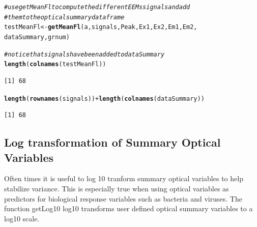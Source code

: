 \documentclass[a4paper,11pt]{article}\usepackage[]{graphicx}\usepackage[]{color}
\makeatletter
\newcommand{\hlcom}[1]{\textcolor[rgb]{0.678,0.584,0.686}{\textit{#1}}}%
\newcommand{\hlopt}[1]{\textcolor[rgb]{0,0,0}{#1}}%
\newcommand{\hlstd}[1]{\textcolor[rgb]{0.345,0.345,0.345}{#1}}%
\newcommand{\hlkwb}[1]{\textcolor[rgb]{0.69,0.353,0.396}{#1}}%
\newcommand{\hlkwd}[1]{\textcolor[rgb]{0.737,0.353,0.396}{\textbf{#1}}}%
\newenvironment{kframe}{%
 \def\at@end@of@kframe{}%
 \ifinner\ifhmode%
  \def\at@end@of@kframe{\end{minipage}}%
  \begin{minipage}{\columnwidth}%
 \fi\fi%
 \def\FrameCommand##1{\hskip\@totalleftmargin \hskip-\fboxsep
 \colorbox{shadecolor}{##1}\hskip-\fboxsep
     \hskip-\linewidth \hskip-\@totalleftmargin \hskip\columnwidth}%
 \MakeFramed {\advance\hsize-\width
   \@totalleftmargin\z@ \linewidth\hsize
   \@setminipage}}%
 {\par\unskip\endMakeFramed%
 \at@end@of@kframe}
\newenvironment{knitrout}{}{} %
\makeatother
\begin{document}
\begin{knitrout}
\begin{kframe}
\begin{alltt}
\hlcom{# use getMeanFl to compute the different EEMs signals and add}
\hlcom{# them to the optical summary data frame}
\hlstd{testMeanFl} \hlkwb{<-} \hlkwd{getMeanFl}\hlstd{(a, signals, Peak, Ex1, Ex2, Em1, Em2,}
    \hlstd{dataSummary, grnum)}

\hlcom{# notice that signals have been added to dataSummary}
\hlkwd{length}\hlstd{(}\hlkwd{colnames}\hlstd{(testMeanFl))}
\end{alltt}
\begin{verbatim}
[1] 68
\end{verbatim}
\begin{alltt}
\hlkwd{length}\hlstd{(}\hlkwd{rownames}\hlstd{(signals))} \hlopt{+} \hlkwd{length}\hlstd{(}\hlkwd{colnames}\hlstd{(dataSummary))}
\end{alltt}
\begin{verbatim}
[1] 68
\end{verbatim}
\end{kframe}
\end{knitrout}

\subsection{Log transformation of Summary Optical Variables}
Often times it is useful to log 10 tranform summary optical variables to help stabilize variance.  This is especially true when using optical variables as predictors for biological response variables such as bacteria and viruses. The function getLog10 log10 transforms user defined optical summary variables to a log10 scale.
\end{document}
